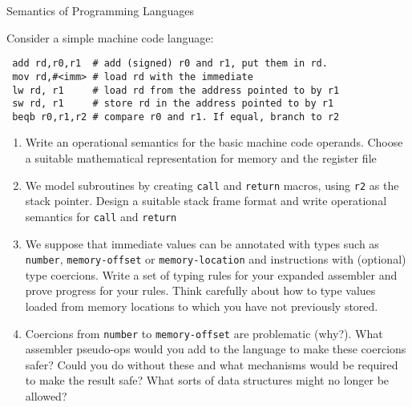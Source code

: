 \documentclass{tripos}
\begin{document}
\begin{question}[MockIA,year=2025,paper=2,question=1,author=nobody]{Semantics of Programming Languages}

  Consider a simple machine code language:

\begin{verbatim}
 add rd,r0,r1  # add (signed) r0 and r1, put them in rd.
 mov rd,#<imm> # load rd with the immediate
 lw rd, r1     # load rd from the address pointed to by r1
 sw rd, r1     # store rd in the address pointed to by r1
 beqb r0,r1,r2 # compare r0 and r1. If equal, branch to r2
\end{verbatim}

\begin{enumerate}
\item Write an operational semantics for the basic machine code operands. Choose a suitable mathematical representation for memory and the register file 
\item We model subroutines by creating \verb|call| and \verb|return| macros, using \verb|r2| as the stack pointer. Design a suitable stack frame format and write operational semantics for \verb|call| and \verb|return| 
\item We suppose that immediate values can be annotated with types such as \verb|number|, \verb|memory-offset| or \verb|memory-location| and instructions with (optional) type coercions. Write a set of typing rules for your expanded assembler and prove progress for your rules. Think carefully about how to type values loaded from memory locations to which you have not previously stored. 
\item Coercions from \verb|number| to \verb|memory-offset| are problematic (why?). What assembler pseudo-ops would you add to the language to make these coercions safer? Could you do without these and what mechanisms would be required to make the result safe? What sorts of data structures might no longer be allowed? 
\end{enumerate}
\end{question}
\end{document}
